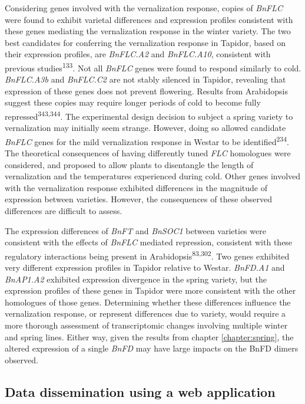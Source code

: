 \documentclass[12pt,]{book}
\begin{document}
Considering genes involved with the vernalization response, copies of
\emph{BnFLC} were found to exhibit varietal differences and expression
profiles consistent with these genes mediating the vernalization
response in the winter variety. The two best candidates for conferring
the vernalization response in Tapidor, based on their expression
profiles, are \emph{BnFLC.A2} and \emph{BnFLC.A10}, consistent with
previous studies\textsuperscript{133}. Not all \emph{BnFLC} genes were
found to respond similarly to cold. \emph{BnFLC.A3b} and \emph{BnFLC.C2}
are not stably silenced in Tapidor, revealing that expression of these
genes does not prevent flowering. Results from Arabidopsis suggest these
copies may require longer periods of cold to become fully
repressed\textsuperscript{343,344}. The experimental design decision to
subject a spring variety to vernalization may initially seem strange.
However, doing so allowed candidate \emph{BnFLC} genes for the mild
vernalization response in Westar to be identified\textsuperscript{234}.
The theoretical consequences of having differently tuned \emph{FLC}
homologues were considered, and proposed to allow plants to disentangle
the length of vernalization and the temperatures experienced during
cold. Other genes involved with the vernalization response exhibited
differences in the magnitude of expression between varieties. However,
the consequences of these observed differences are difficult to assess.

The expression differences of \emph{BnFT} and \emph{BnSOC1} between
varieties were consistent with the effects of \emph{BnFLC} mediated
repression, consistent with these regulatory interactions being present
in Arabidopsis\textsuperscript{83,302}. Two genes exhibited very
different expression profiles in Tapidor relative to Westar.
\emph{BnFD.A1} and \emph{BnAP1.A2} exhibited expression divergence in
the spring variety, but the expression profiles of these genes in
Tapidor were more consistent with the other homologues of those genes.
Determining whether these differences influence the vernalization
response, or represent differences due to variety, would require a more
thorough assessment of transcriptomic changes involving multiple winter
and spring lines. Either way, given the results from chapter
\ref{chapter:spring}, the altered expression of a single \emph{BnFD} may
have large impacts on the BnFD dimers observed.

\subsection{Data dissemination using a web
application}\label{data-dissemination-using-a-web-application}
\end{document}

